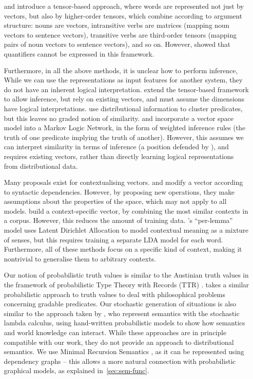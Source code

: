 \documentclass[a4paper,11pt]{article}
\begin{document}
\citet{coecke2010tensor} and \citet{baroni2014tensor} introduce a tensor-based approach,
where words are represented not just by vectors,
but also by higher-order tensors, which combine according to argument structure:
nouns are vectors,
intransitive verbs are matrices (mapping noun vectors to sentence vectors),
transitive verbs are third-order tensors (mapping pairs of noun vectors to sentence vectors),
and so on.
However, \citet{grefenstette2013tensor} showed that
quantifiers cannot be expressed in this framework.

Furthermore, in all the above methods, it is unclear how to perform inference,
While we can use the representations as input features for another system,
they do not have an inherent logical interpretation.
\citet{balkir2016sentence} extend the tensor-based framework to allow inference,
but rely on existing vectors, and must assume the dimensions have logical interpretations.
\citet{lewis2013logic} use distributional information to cluster predicates,
but this leaves no graded notion of similarity.
\citet{garrette2011logic} and \citet{beltagy2016logic}
incorporate a vector space model into a Markov Logic Network,
in the form of weighted inference rules
(the truth of one predicate implying the truth of another).
However, this assumes we can interpret similarity in terms of inference
(a position defended by \citet{erk2016alligator}),
and requires existing vectors,
rather than directly learning logical representations from distributional data.

Many proposals exist for contextualising vectors.
\citet{erk2008context} and \citet{thater2011context}
modify a vector according to syntactic dependencies.
However, by proposing new operations,
they make assumptions about the properties of the space,
which may not apply to all models.
\citet{erk2010exemplar} build a context-specific vector,
by combining the most similar contexts in a corpus.
However, this reduces the amount of training data.
\citet{lui2012usage}'s ``per-lemma'' model uses Latent Dirichlet Allocation
to model contextual meaning as a mixture of senses,
but this requires training a separate LDA model for each word.
Furthermore, all of these methods focus on a specific kind of context,
making it nontrivial to generalise them to arbitrary contexts.

Our notion of probabilistic truth values
is similar to the Austinian truth values in
the framework of probabilistic Type Theory with Records (TTR) \citep{cooper2005type,cooper2015prob}.
\citet{sutton2015prob,sutton2017prob} takes a similar probabilistic approach to truth values
to deal with philosophical problems concerning gradable predicates.
Our stochastic generation of situations
is also similar to the approach taken by \citet{goodman2015prob},
who represent semantics with the stochastic lambda calculus,
using hand-written probabilistic models to show how semantics and world knowledge can interact.
While these approaches are in principle compatible with our work,
they do not provide an approach to distributional semantics.
We use Minimal Recursion Semantics \citep{copestake2005mrs},
as it can be represented using dependency graphs --
this allows a more natural connection with probabilistic graphical models,
as explained in~\cref{sec:sem-func}.
\end{document}
